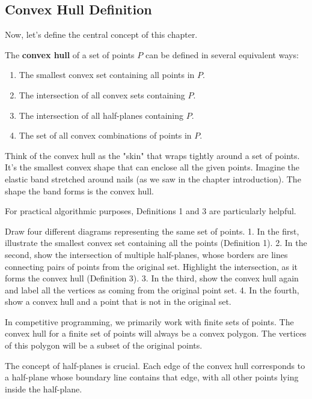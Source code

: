 \subsection{Convex Hull Definition}
\label{sec:convex-hull-definition}

Now, let's define the central concept of this chapter.

\begin{definition}
The \textbf{convex hull} of a set of points $P$ can be defined in several equivalent ways:

\begin{enumerate}
    \item The smallest convex set containing all points in $P$.
    \item The intersection of all convex sets containing $P$.
    \item The intersection of all half-planes containing $P$.
    \item The set of all convex combinations of points in $P$.
\end{enumerate}
\end{definition}

\begin{intuition}
Think of the convex hull as the "skin" that wraps tightly around a set of points. It's the smallest convex shape that can enclose all the given points. Imagine the elastic band stretched around nails (as we saw in the chapter introduction). The shape the band forms is the convex hull.
\end{intuition}

For practical algorithmic purposes, Definitions 1 and 3 are particularly helpful.

\begin{visualexample}
\label{vis:convex-hull-definitions}
Draw four different diagrams representing the same set of points.
1.  In the first, illustrate the smallest convex set containing all the points (Definition 1).
2.  In the second, show the intersection of multiple half-planes, whose borders are lines connecting pairs of points from the original set. Highlight the intersection, as it forms the convex hull (Definition 3).
3.  In the third, show the convex hull again and label all the vertices as coming from the original point set.
4.  In the fourth, show a convex hull and a point that is not in the original set.
\end{visualexample}

In competitive programming, we primarily work with finite sets of points. The convex hull for a finite set of points will always be a convex polygon. The vertices of this polygon will be a subset of the original points.

\begin{insight}
The concept of half-planes is crucial. Each edge of the convex hull corresponds to a half-plane whose boundary line contains that edge, with all other points lying inside the half-plane.
\end{insight}
